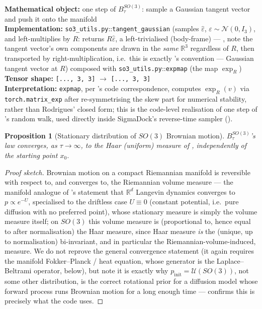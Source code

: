 \documentclass[11pt,a4paper]{report}
\newtheorem{proposition}[proposition]{Proposition}
\theoremstyle{definition}
\theoremstyle{remark}
\newcommand{\RR}{\mathbb R}
\newcommand{\file}[1]{\texttt{#1}}
\newcommand{\pyfunc}[1]{\texttt{#1}}
\newcommand{\shape}[1]{\texttt{[#1]}}
\begin{document}
\begin{codebox}
\textbf{Mathematical object:} one step of $B^{SO(3)}_\tau$: sample a
Gaussian tangent vector and push it onto the manifold \\
\textbf{Implementation:} \file{so3\_utils.py}::\pyfunc{tangent\_gaussian}
(samples $\widehat\varepsilon$, $\varepsilon\sim\mathcal N(0,I_3)$, and
left-multiplies by $R$: returns $R\widehat\varepsilon$, a
left-trivialised (body-frame) --- , note the tangent
vector's own components are drawn in the \emph{same} $\RR^3$ regardless of
$R$, then transported by right-multiplication, i.e.\ this is exactly
's convention --- Gaussian tangent vector at
$R$) composed with \file{so3\_utils.py}::\pyfunc{expmap} (the map
$\exp_R$) \\
\textbf{Tensor shape:} \shape{..., 3, 3} $\to$ \shape{..., 3, 3} \\
\textbf{Interpretation:} \pyfunc{expmap}, per 's
code correspondence, computes $\exp_R(v)$ via \texttt{torch.matrix\_exp}
after re-symmetrising the skew part for numerical stability, rather than
Rodrigues' closed form; this is the code-level realisation of one step of
's random walk, used directly inside
SigmaDock's reverse-time sampler ().
\end{codebox}

\begin{proposition}[Stationary distribution of $SO(3)$ Brownian motion]
\label{prop:so3-brownian-stationary}
$B^{SO(3)}_\tau$'s law converges, as $\tau\to\infty$, to the Haar (uniform)
measure of , independently of the starting point $x_0$.
\end{proposition}

\begin{proof}[Proof sketch]
Brownian motion on a compact Riemannian manifold is reversible with respect
to, and converges to, the Riemannian volume measure --- the manifold
analogue of 's statement that $\RR^d$ Langevin dynamics
converges to $p\propto e^{-U}$, specialised to the driftless case $U\equiv0$
(constant potential, i.e.\ pure diffusion with no preferred point), whose
stationary measure is simply the volume measure itself; on $SO(3)$ this
volume measure is (proportional to, hence equal to after normalisation)
the Haar measure, since Haar measure \emph{is} the (unique, up to
normalisation) bi-invariant, and in particular the Riemannian-volume-induced,
measure. We do not reprove the general convergence statement (it again
requires the manifold Fokker--Planck / heat equation, whose generator is
the Laplace--Beltrami operator,  below), but note
it is exactly why $p_{\mathrm{init}}=\mathcal U(SO(3))$, not some other
distribution, is the correct rotational prior for a diffusion model whose
forward process runs Brownian motion for a long enough time
---  confirms this is precisely what the code
uses.
\end{proof}
\end{document}
